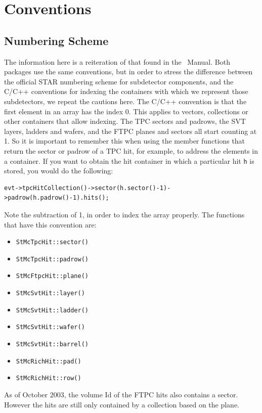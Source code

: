 \section{Conventions}
\subsection{Numbering Scheme}
\label{sec:numberscheme}
The information here is a reiteration of that found in the \StEvent\
Manual.  Both packages use the same conventions, but in order to
stress the difference between the official STAR numbering scheme
for subdetector components, and
the C/C++ conventions for indexing the containers with which we represent those
subdetectors, we repeat the cautions here.  The C/C++ convention
is that the first element in an array has the index 0.  This applies
to vectors, collections or other containers that allow indexing.
The TPC sectors and padrows,
the SVT layers, ladders and wafers, and the FTPC planes and sectors
all start counting at 1.  So it is important to remember this when
using the member functions that return the sector or padrow of a
TPC hit, for example, to address the elements in a container.  If
you want to obtain the hit container in which a particular hit
\verb+h+ is stored, you would do the following:

\begin{verbatim}
evt->tpcHitCollection()->sector(h.sector()-1)->padrow(h.padrow()-1).hits();
\end{verbatim}
Note the subtraction of 1, in order to index the array properly.
The functions that have this convention are:

\begin{itemize}
	\item \texttt{StMcTpcHit::sector()}
	\item \texttt{StMcTpcHit::padrow()}
	\item \texttt{StMcFtpcHit::plane()}
	\item \texttt{StMcSvtHit::layer()}
	\item \texttt{StMcSvtHit::ladder()}
	\item \texttt{StMcSvtHit::wafer()}
	\item \texttt{StMcSvtHit::barrel()}
	\item \texttt{StMcRichHit::pad()}
	\item \texttt{StMcRichHit::row()}
\end{itemize}

As of October 2003, the volume Id of the FTPC hits also contains a sector.  However the hits
are still only contained by a collection based on the plane.

